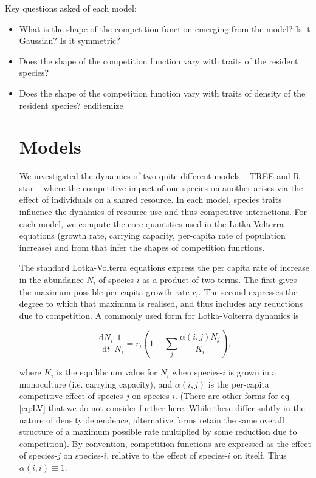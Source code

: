 \documentclass[a4paper,11pt]{article}
\newcommand{\ud}{\ensuremath{\mathrm{d}}}
\begin{document}
Key questions asked of each model:

\begin{itemize}
\item What is the shape of the competition function emerging from the
  model? Is it Gaussian? Is it symmetric?
\item Does the shape of the competition function vary with traits of
  the resident species?
\item Does the shape of the competition function vary with traits of
  density of the resident species?
end{itemize}

\section{Models}


We investigated the dynamics of two quite different models -- TREE and R-star
-- where the competitive impact of one species on another arises via the
effect of individuals on a shared resource. In each model, species traits
influence the dynamics of resource use and thus competitive interactions. For
each model, we compute the core quantities used in the Lotka-Volterra
equations (growth rate, carrying capacity,  per-capita rate of population
increase) and from that infer the shapes of competition functions.

The standard Lotka-Volterra equations express the per capita rate of increase
in the abundance $N_i$ of species $i$ as a product of two terms. The first
gives the maximum possible per-capita growth rate $r_i$. The second expresses
the degree to which that maximum is realised, and thus includes any reductions
due to competition. A commonly used form for Lotka-Volterra dynamics is

\begin{equation}
\label{eq:LV}
\frac{\ud N_i}{\ud t} \frac{1}{N_i} =  r_i \left(1 - \sum_j
                                      \frac{\alpha(i,j) N_j}{K_i}\right),
\end{equation}

where $K_i$ is the equilibrium value for $N_i$ when species-$i$ is grown in a
monoculture  (i.e. carrying capacity), and $\alpha(i,j)$ is the per-capita
competitive effect of species-$j$ on species-$i$. (There are other forms for eq
\ref{eq:LV} that we do not consider further here. While these differ subtly in
the nature of density dependence, alternative forms retain the same overall
structure of a maximum possible rate multiplied by some reduction due to
competition). By convention, competition functions are expressed as the effect
of species-$j$ on species-$i$, relative to the effect of species-$i$ on itself.
Thus $\alpha(i, i) \equiv 1$.


\end{itemize}
\end{document}
